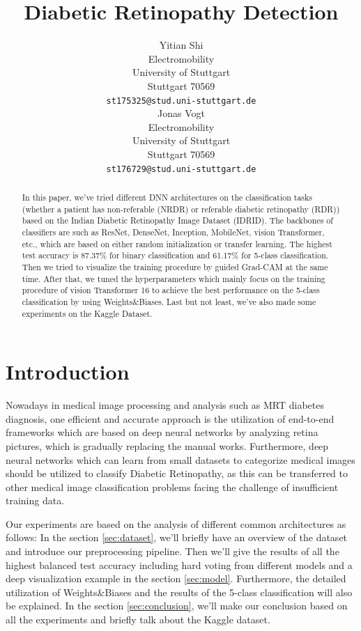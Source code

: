 \documentclass{article}
\title{Diabetic Retinopathy Detection}
\author{
  Yitian Shi\\
 Electromobility\\
 University of Stuttgart\\
  Stuttgart 70569 \\
  \texttt{st175325@stud.uni-stuttgart.de} \\
   \And
Jonas Vogt\\
 Electromobility\\
 University of Stuttgart\\
  Stuttgart 70569 \\
  \texttt{st176729@stud.uni-stuttgart.de} \\
}
\begin{document}
\maketitle

\begin{abstract}
In this paper, we've tried different DNN architectures on the classification tasks (whether a patient has non-referable (NRDR) or referable diabetic retinopathy (RDR)) based on the Indian Diabetic Retinopathy Image Dataset (IDRID). The backbones of classifiers are such as ResNet, DenseNet, Inception, MobileNet, vision Transformer, etc., which are based on either random initialization or transfer learning. The highest test accuracy is 87.37\% for binary classification and 61.17\% for 5-class classification. Then we tried to visualize the training procedure by guided Grad-CAM at the same time. After that, we tuned the hyperparameters which mainly focus on the training procedure of vision Transformer 16 to achieve the best performance on the 5-class classification by using Weights\&Biases. Last but not least, we've also made some experiments on the Kaggle Dataset.

\end{abstract}


\section{Introduction}
Nowadays in medical image processing and analysis such as MRT diabetes diagnosis, one efficient and accurate approach is the utilization of end-to-end frameworks which are based on deep neural networks by analyzing retina pictures, which is gradually replacing the manual works. Furthermore, deep neural networks which can learn from small datasets to categorize medical images should be utilized to classify Diabetic Retinopathy, as this can be transferred to other medical image classification problems facing the challenge of insufficient training data\cite{misgina}.

Our experiments are based on the analysis of different common architectures as follows: In the section \ref{sec:dataset}, we'll briefly have an overview of the dataset and introduce our preprocessing pipeline. Then we'll give the results of all the highest balanced test accuracy including hard voting from different models and a deep visualization example in the section \ref{sec:model}. Furthermore, the detailed utilization of Weights\&Biases and the results of the 5-class classification will also be explained. In the section \ref{sec:conclusion}, we'll make our conclusion based on all the experiments and briefly talk about the Kaggle dataset.
\end{document}
